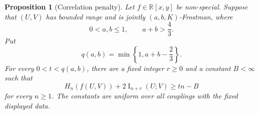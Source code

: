 \documentclass[11pt]{article}
\newtheorem{proposition}[theorem]{Proposition}
\begin{document}
\begin{proposition}[Correlation penalty]
\label{prop_pham_correlation}
Let $f\in\mathbb R[x,y]$ be non-special.  Suppose that $(U,V)$ has
bounded range and is jointly $(a,b,K)$-Frostman, where
\[
 0<a,b\leq1,\qquad a+b>\frac{4}{3}.
\]
Put
\begin{equation}
 q(a,b)=\min\left\{1,a+b-\frac{2}{3}\right\}.
 \label{eq_pham_q_ab}
\end{equation}
For every $0<t<q(a,b)$, there are a fixed integer $r\geq0$ and a
constant $B<\infty$ such that
\begin{equation}
 H_n(f(U,V))+2\operatorname{I}_{n+r}(U;V)\geq t n-B
 \label{eq_pham_correlation}
\end{equation}
for every $n\geq1$.  The constants are uniform over all couplings
with the fixed displayed data.
\end{proposition}
\end{document}
